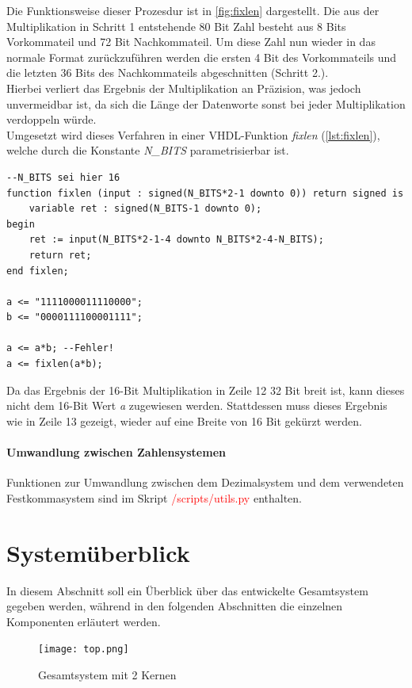 \documentclass[a4paper,12pt,onesided]{report}
\begin{document}
Die Funktionsweise dieser Prozesdur ist in \autoref{fig:fixlen} dargestellt.
Die aus der Multiplikation in Schritt 1 entstehende 80 Bit Zahl besteht aus 8 Bits Vorkommateil und 72 Bit Nachkommateil.
Um diese Zahl nun wieder in das normale Format zurückzuführen werden die ersten 4 Bit des Vorkommateils und die letzten 36 Bits des Nachkommateils abgeschnitten (Schritt 2.).\\
Hierbei verliert das Ergebnis der Multiplikation an Präzision, was jedoch unvermeidbar ist, da sich die Länge der Datenworte sonst bei jeder Multiplikation verdoppeln würde.\\
Umgesetzt wird dieses Verfahren in einer VHDL-Funktion \textit{fixlen} (\autoref{lst:fixlen}), welche durch die Konstante \textit{N\_BITS} parametrisierbar ist.
\begin{lstlisting}[label=lst:fixlen,caption=VHDL-Funktion \textit{fixlen} aus \textcolor{red}{/src/mandel-zybo.srcs/sources\_1/imports/new/mbcore.vhd}]
--N_BITS sei hier 16
function fixlen (input : signed(N_BITS*2-1 downto 0)) return signed is
	variable ret : signed(N_BITS-1 downto 0);
begin
	ret := input(N_BITS*2-1-4 downto N_BITS*2-4-N_BITS);
	return ret;
end fixlen;

a <= "1111000011110000";
b <= "0000111100001111";

a <= a*b; --Fehler!
a <= fixlen(a*b);
\end{lstlisting}
Da das Ergebnis der 16-Bit Multiplikation in Zeile 12 32 Bit breit ist, kann dieses nicht dem 16-Bit Wert \textit{a} zugewiesen werden.
Stattdessen muss dieses Ergebnis wie in Zeile 13 gezeigt, wieder auf eine Breite von 16 Bit gekürzt werden.

\paragraph{Umwandlung zwischen Zahlensystemen}
Funktionen zur Umwandlung zwischen dem Dezimalsystem und dem verwendeten Festkommasystem sind im Skript \textcolor{red}{/scripts/utils.py} enthalten.

\section{Systemüberblick}
\label{sec:überblick}
In diesem Abschnitt soll ein Überblick über das entwickelte Gesamtsystem gegeben werden, während in den folgenden Abschnitten die einzelnen Komponenten erläutert werden.

\begin{figure}[H]
	\centering
	\texttt{[image: top.png]}
	\caption{Gesamtsystem mit 2 Kernen}
	\label{fig:top}
\end{figure}
\end{document}
